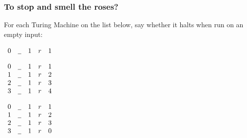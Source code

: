 \begin{frame}
\frametitle{To stop and smell the roses?}

For each Turing Machine on the list below, say whether it halts when run on an empty input:

\begin{multicols}{3}


\(
\begin{array}{ccccc}
0 &\underline{\enspace} &1 &r &1
\end{array}
\)

\pause 
\columnbreak

\(
\begin{array}{ccccc}
0 &\underline{\enspace} &1 &r &1\\
1 &\underline{\enspace} &1 &r &2\\
2 &\underline{\enspace} &1 &r &3\\
3 &\underline{\enspace} &1 &r &4
\end{array}
\)


\pause 
\columnbreak

\(
\begin{array}{ccccc}
0 &\underline{\enspace} &1 &r &1\\
1 &\underline{\enspace} &1 &r &2\\
2 &\underline{\enspace} &1 &r &3\\
3 &\underline{\enspace} &1 &r &0
\end{array}
\)



\end{multicols}


\end{frame}

